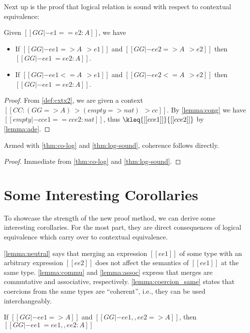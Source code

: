 Next up is the proof that logical relation is sound with respect to contextual equivalence:
\begin{theorem} \label{thm:log-sound}
  Given $[[GG |- e1 == e2 : A]]$, we have
  \begin{itemize}
  \item If $[[ GG |- ee1 => A ~~> e1]]$ and $[[ GG |- ee2 => A ~~> e2]]$ then
    $[[ GG |- ee1 ~= ee2 : A ]]$.
  \item If $[[ GG |- ee1 <= A ~~> e1]]$ and $[[ GG |- ee2 <= A ~~> e2]]$ then
    $[[ GG |- ee1 ~= ee2 : A ]]$.
  \end{itemize}
\end{theorem}
\begin{proof}
  From \cref{def:cxtx2}, we are given a context $[[  CC : (GG => A) ~> (empty => nat) ~~> cc ]]$. By \cref{lemma:cong}
  we have $[[  empty |- cc{e1} == cc{e2} : nat  ]]$, thus $  \kleq{[[ cc{e1} ]]}{ [[cc{e2} ]]}    $ by \cref{lemma:ade}.
\end{proof}


Armed with \cref{thm:co-log} and \cref{thm:log-sound}, coherence follows directly.
\coherence*
\begin{proof}
  Immediate from \cref{thm:co-log} and \cref{thm:log-sound}.
\end{proof}

\section{Some Interesting Corollaries}

To showcase the strength of the new proof method, we can derive some
interesting corollaries. For the most part, they are direct consequences of
logical equivalence which carry over to contextual equivalence.


\cref{lemma:neutral} says that merging an expression $[[ee1]]$ of some type with
an arbitrary expression $[[ee2]]$ does not affect the semantics of $[[ee1]]$ at
the same type. \cref{lemma:commu} and \cref{lemma:assoc} express that merges are
commutative and associative, respectively. \cref{lemma:coercion_same} states
that coercions from the same types are ``coherent'', i.e., they can be used
interchangeably.

\begin{corollary}[Neutrality] \label{lemma:neutral}
  If $[[GG |- ee1 => A ]]$ and $[[GG |- ee1 ,, ee2 => A ]]$, then
  $[[GG |- ee1 ~= ee1 ,, ee2 : A]]$
\end{corollary}

